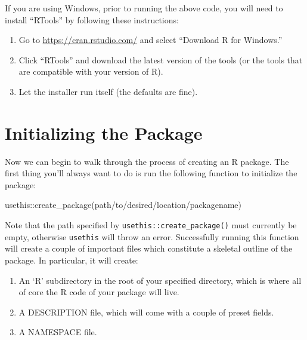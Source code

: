 \documentclass[
]{book}
\newenvironment{Shaded}{\begin{snugshade}}{\end{snugshade}}
\newcommand{\FunctionTok}[1]{\textcolor[rgb]{0.00,0.00,0.00}{#1}}
\newcommand{\NormalTok}[1]{#1}
\newcommand{\SpecialCharTok}[1]{\textcolor[rgb]{0.00,0.00,0.00}{#1}}
\newcommand{\StringTok}[1]{\textcolor[rgb]{0.31,0.60,0.02}{#1}}
\providecommand{\tightlist}{%
  \setlength{\itemsep}{0pt}\setlength{\parskip}{0pt}}
\begin{document}
If you are using Windows, prior to running the above code, you will need to install ``RTools'' by following these instructions:

\begin{enumerate}
\def\labelenumi{\arabic{enumi}.}
\item
  Go to \url{https://cran.rstudio.com/} and select ``Download R for Windows.''
\item
  Click ``RTools'' and download the latest version of the tools (or the tools that are compatible with your version of R).
\item
  Let the installer run itself (the defaults are fine).
\end{enumerate}

\hypertarget{initializing-the-package}{%
\section{Initializing the Package}\label{initializing-the-package}}

Now we can begin to walk through the process of creating an R package. The first thing you'll always want to do is run the following function to initialize the package:

\begin{Shaded}
\begin{Highlighting}[]
\NormalTok{usethis}\SpecialCharTok{::}\FunctionTok{create\_package}\NormalTok{(}\StringTok{\textquotesingle{}path/to/desired/location/packagename\textquotesingle{}}\NormalTok{)}
\end{Highlighting}
\end{Shaded}

Note that the path specified by \texttt{usethis::create\_package()} must currently be empty, otherwise \texttt{usethis} will throw an error. Successfully running this function will create a couple of important files which constitute a skeletal outline of the package. In particular, it will create:

\begin{enumerate}
\def\labelenumi{\arabic{enumi}.}
\tightlist
\item
  An `R' subdirectory in the root of your specified directory, which is where all of core the R code of your package will live.
\item
  A DESCRIPTION file, which will come with a couple of preset fields.
\item
  A NAMESPACE file.
\end{enumerate}
\end{document}
